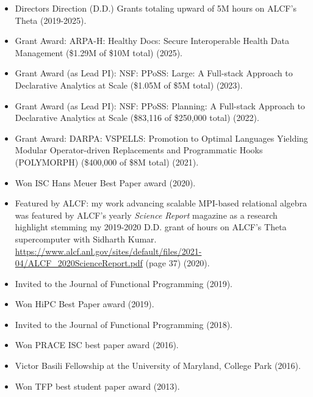 \begin{itemize}
\item Directors Direction (D.D.) Grants totaling upward of 5M hours on ALCF's Theta (2019-2025).
\item Grant Award: ARPA-H: Healthy Docs: Secure Interoperable Health Data Management (\$1.29M of \$10M total) (2025).
\item Grant Award (as Lead PI): NSF: PPoSS: Large: A Full-stack Approach to Declarative Analytics at Scale (\$1.05M of \$5M total) (2023).
\item Grant Award (as Lead PI): NSF: PPoSS: Planning: A Full-stack Approach to Declarative Analytics at Scale (\$83,116 of \$250,000 total) (2022).
\item Grant Award: DARPA: VSPELLS: Promotion to Optimal Languages Yielding Modular Operator-driven Replacements and Programmatic Hooks (POLYMORPH) (\$400,000 of \$8M total) (2021).
\item Won ISC Hans Meuer Best Paper award (2020).
\item Featured by ALCF: my work advancing scalable MPI-based relational algebra was featured by ALCF's yearly \emph{Science Report} magazine as a research highlight stemming my 2019-2020 D.D. grant of hours on ALCF's Theta supercomputer with Sidharth Kumar. \url{https://www.alcf.anl.gov/sites/default/files/2021-04/ALCF_2020ScienceReport.pdf} (page 37) (2020).
\item Invited to the Journal of Functional Programming (2019).
\item Won HiPC Best Paper award (2019).
\item Invited to the Journal of Functional Programming (2018).
\item Won PRACE ISC best paper award (2016).
\item Victor Basili Fellowship at the University of Maryland, College Park (2016).
\item Won TFP best student paper award (2013).
\end{itemize}
